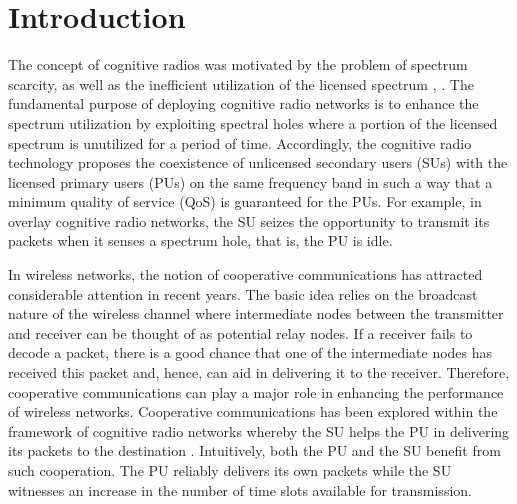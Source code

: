 \documentclass[conference]{IEEEtran}
\begin{document}
\section{Introduction}


The concept of cognitive radios was motivated by the
problem of spectrum scarcity, as well as the inefficient
utilization of the licensed spectrum  \cite{Mitola}, \cite{H_CR}.
The fundamental purpose of deploying cognitive radio networks is
to enhance the spectrum utilization by exploiting spectral holes
where a portion of the licensed spectrum is unutilized for a
period of time. Accordingly, the cognitive radio technology proposes 
the coexistence of unlicensed secondary users (SUs) with the licensed
primary users (PUs) on the same frequency band in such a way that
a minimum quality of service (QoS) is guaranteed for the PUs. For
example, in overlay cognitive radio networks, the SU seizes the 
opportunity to transmit its packets when it senses a spectrum hole, 
that is, the PU is idle.

In wireless networks, the notion of cooperative communications has
attracted considerable attention in recent years. The  basic idea 
relies on the broadcast nature of the wireless
channel where intermediate nodes between the transmitter and 
receiver can be thought of as potential relay nodes. If a receiver
fails to decode a packet, there is a good chance that one of the
intermediate nodes has received this packet and, hence, can aid
in delivering it to the receiver. Therefore, cooperative
communications can play a major role in enhancing the performance
of wireless networks. Cooperative communications has been explored 
within the framework of cognitive radio networks whereby the SU 
helps the PU in delivering its packets to the destination \cite{Tse,Kramer}.
Intuitively, both the PU and the SU benefit from such cooperation.
The PU reliably delivers its own packets while the SU witnesses an 
increase in the number of time slots available for transmission.
\end{document}
